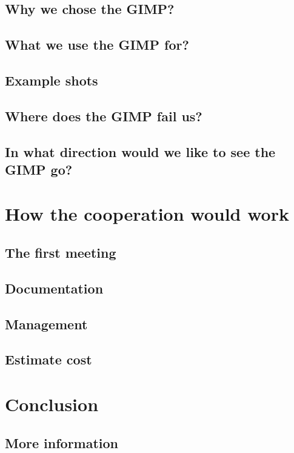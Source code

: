 \documentclass{report}
\begin{document}
\section{Why we chose the GIMP?}

\section{What we use the GIMP for?}

\section{Example shots}

\section{Where does the GIMP fail us?}

\section{In what direction would we like to see the GIMP go?} 


\chapter{How the cooperation would work}

\section{The first meeting}
\section{Documentation}
\section{Management}
\section{Estimate cost}

\chapter{Conclusion}

\section{More information}

{
\small


}



\end{document}
